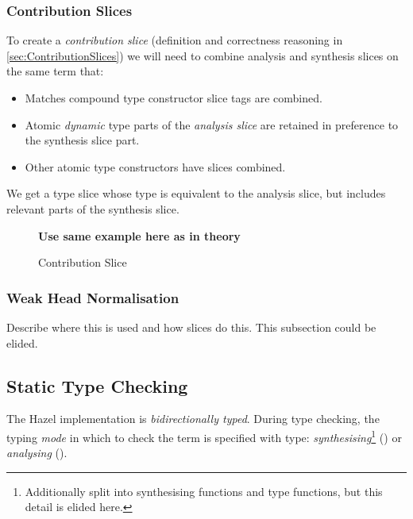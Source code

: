 \subsubsection{Contribution Slices}
\label{sec:ContributionSliceImplementation}
To create a \textit{contribution slice} (definition and correctness reasoning in \cref{sec:ContributionSlices}) we will need to combine analysis and synthesis slices on the same term that:
\begin{itemize}
\item Matches compound type constructor slice tags are combined.
\item Atomic \textit{dynamic} type parts of the \textit{analysis slice} are retained in preference to the synthesis slice part. 
\item Other atomic type constructors have slices combined.
\end{itemize} 
We get a type slice whose type is equivalent to the analysis slice, but includes relevant parts of the synthesis slice.
\begin{figure}[h]
\textbf{Use same example here as in theory}
\caption{Contribution Slice}
\label{fig:ContributionSliceExample}
\end{figure}

\subsubsection{Weak Head Normalisation}
Describe where this is used and how slices do this. This subsection could be elided.

\subsection{Static Type Checking}\label{sec:TypeChecking}
The Hazel implementation is \textit{bidirectionally typed}. During type checking, the typing \textit{mode} in which to check the term is specified with  type: \textit{synthesising}\footnote{Additionally split into synthesising functions and type functions, but this detail is elided here.} () or \textit{analysing} ().


